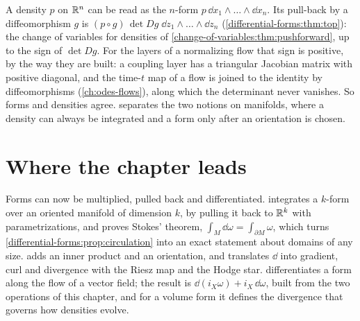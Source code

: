 \begin{notechapter}
\begin{mlthread}
A density $p$ on $\mathbb{R}^n$ can be read as the $n$-form
$p\,\dd x_1\wedge\dots\wedge\dd x_n$. Its pull-back by a diffeomorphism
$g$ is $(p\circ g)\,\det Dg\;\dd z_1\wedge\dots\wedge\dd z_n$
(\cref{differential-forms:thm:top}): the change of variables for
densities of \cref{change-of-variables:thm:pushforward}, up to the
sign of $\det Dg$. For the layers of a normalizing flow that sign is
positive, by the way they are built: a coupling layer has a triangular
Jacobian matrix with positive diagonal, and the time-$t$ map of a flow
is joined to the identity by diffeomorphisms
(\cref{ch:odes-flows}), along which the determinant never vanishes. So
forms and densities agree.  separates the two notions on
manifolds, where a density can always be integrated and a form only
after an orientation is chosen.
\end{mlthread}

\section{Where the chapter leads}\label{differential-forms:sec:outlook}

Forms can now be multiplied, pulled back and differentiated.
 integrates a $k$-form over an oriented manifold of
dimension $k$, by pulling it back to $\mathbb{R}^k$ with parametrizations, and
proves Stokes' theorem, $\int_M\dd\omega = \int_{\partial M}\omega$,
which turns \cref{differential-forms:prop:circulation} into an exact
statement about domains of any size.  adds an
inner product and an orientation, and translates $\dd$ into gradient,
curl and divergence with the Riesz map and the Hodge star.
 differentiates a form along the flow of a vector
field; the result is $\dd(i_X\omega) + i_X\,\dd\omega$, built from the
two operations of this chapter, and for a volume form it defines the
divergence that governs how densities evolve.


\end{notechapter}
